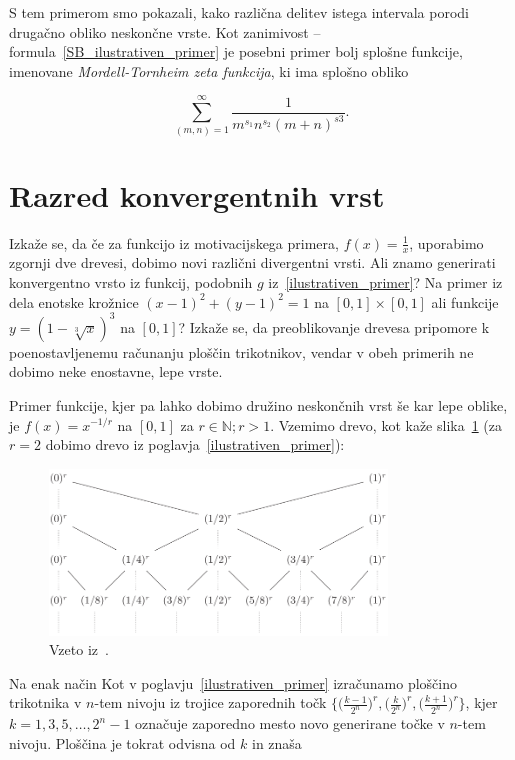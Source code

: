 \documentclass[a4paper, 12pt, titlepage]{article}
\begin{document}
S tem primerom smo pokazali, kako različna delitev istega intervala porodi drugačno obliko neskončne vrste. Kot zanimivost -- formula~\ref{SB_ilustrativen_primer} je posebni primer bolj splošne funkcije, imenovane \emph{Mordell-Tornheim zeta funkcija}, ki ima splošno obliko

\begin{equation}
    \sum_{(m,n)=1}^{\infty} \frac{1}{m^{s_1}n^{s_2}(m+n)^{s3}}\text{.}
\end{equation}


\section{Razred konvergentnih vrst}

Izkaže se, da če za funkcijo iz motivacijskega primera, $ f(x) = \frac{1}{x} $, uporabimo zgornji dve drevesi, dobimo novi različni divergentni vrsti. Ali znamo generirati konvergentno vrsto iz funkcij, podobnih $ g $ iz~\ref{ilustrativen_primer}? Na primer iz dela enotske krožnice $ (x-1)^2+(y-1)^2=1 $ na $ [0,1] \times [0,1]$ ali funkcije $ y = (1-\sqrt[3]{x})^3 $ na $ [0,1] $? Izkaže se, da preoblikovanje drevesa pripomore k poenostavljenemu računanju ploščin trikotnikov, vendar v obeh primerih ne dobimo neke enostavne, lepe vrste.

Primer funkcije, kjer pa lahko dobimo družino neskončnih vrst še kar lepe oblike, je $ f(x)=x^{-1/r} $ na $ [0,1] $ za $ r \in \mathbb{N}; r > 1 $. Vzemimo drevo, kot kaže slika~\ref{r_drevo} (za $ r = 2 $ dobimo drevo iz poglavja~\ref{ilustrativen_primer}):

\begin{figure}[h!]
    \centering
    \includegraphics[width=0.8\textwidth]{slike/r_drevo.png}
    \caption{Vzeto iz~\cite{osnovni_clanek}.}
    \label{r_drevo}
\end{figure}

Na enak način Kot v poglavju~\ref{ilustrativen_primer} izračunamo ploščino trikotnika v $ n $-tem nivoju iz trojice zaporednih točk $ \{\bigl(\frac{k-1}{2^n}\bigr)^r, \bigl(\frac{k}{2^n}\bigr)^r, \bigl(\frac{k+1}{2^n}\bigr)^r\} $, kjer $ k = 1, 3, 5, \ldots, 2^n-1 $ označuje zaporedno mesto novo generirane točke v $ n $-tem nivoju. Ploščina je tokrat odvisna od $ k $ in znaša
\end{document}
